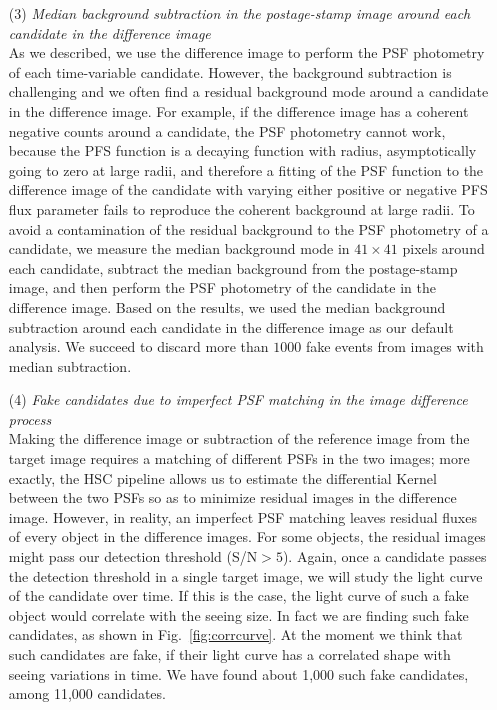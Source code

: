 \documentclass[iop, apj]{emulateapj}
\newcommand{\?}{\stackrel{?}{=}}
\begin{document}
\begin{itemize}
\item[(3)]{\it Median background subtraction in the postage-stamp image around each candidate in the difference image}\\
As we described, we use the difference image to perform the PSF photometry of each time-variable candidate. However, the background subtraction is challenging and we often find a residual background mode around a candidate in the difference image. 
For example, if the difference image has a coherent negative counts around a candidate, the PSF photometry cannot work, because the PFS function is a decaying function with radius, asymptotically going to zero at large radii, and therefore a fitting of the PSF function to the difference image of the candidate with varying either positive or negative PFS flux parameter fails to reproduce the coherent background at large radii. 
To avoid a contamination of the residual background to the PSF photometry of a candidate, we measure the median background mode in $41 \times 41$ pixels around each candidate, subtract the median background from the postage-stamp image, and then perform the PSF photometry of the candidate in the difference image. 
Based on the results, we used the median background subtraction around each candidate in the difference image as our default analysis. We succeed to discard more than $1000$ fake events from images with median subtraction. 
%
%
%
\item[(4)]{\it Fake candidates due to imperfect PSF matching in the image difference process}\\
\label{sec:unsolved}
Making the difference image or subtraction of the reference image from the target image requires a matching of different PSFs in the two images; more exactly, the HSC pipeline allows us to estimate the differential Kernel between the two PSFs so as to minimize residual images in the difference image. However, in reality, an imperfect PSF matching leaves residual fluxes of every object in the difference images. For some objects, the residual images might pass our detection threshold (S/N$>5$). Again, once a candidate passes the detection threshold in a single target image, we will study the light curve of the candidate over time. If this is the case, the light curve of such a fake object would correlate with the seeing size. In fact we are finding such fake candidates, as shown in Fig.~\ref{fig:corrcurve}. At the moment we think that such candidates are fake, if their light curve has a correlated shape with seeing variations in time. We have found about 1,000 such fake candidates, among 11,000 candidates. 

\end{itemize}
\end{document}
